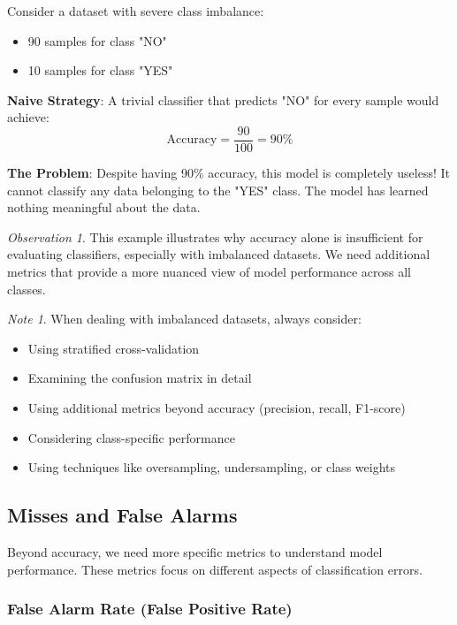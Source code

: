 \documentclass[11pt,a4paper]{article}
\theoremstyle{definition}
\theoremstyle{plain}
\theoremstyle{remark}
\newtheorem*{remark}{Note}
\newtheorem*{observation}{Observation}
\begin{document}
Consider a dataset with severe class imbalance:
\begin{itemize}
    \item 90 samples for class "NO"
    \item 10 samples for class "YES"
\end{itemize}

\textbf{Naive Strategy}: A trivial classifier that predicts "NO" for every sample would achieve:
\[
\text{Accuracy} = \frac{90}{100} = 90\%
\]

\textbf{The Problem}: Despite having 90\% accuracy, this model is completely useless! It cannot classify any data belonging to the "YES" class. The model has learned nothing meaningful about the data.

\begin{observation}
This example illustrates why accuracy alone is insufficient for evaluating classifiers, especially with imbalanced datasets. We need additional metrics that provide a more nuanced view of model performance across all classes.
\end{observation}

\begin{remark}
When dealing with imbalanced datasets, always consider:
\begin{itemize}
    \item Using stratified cross-validation
    \item Examining the confusion matrix in detail
    \item Using additional metrics beyond accuracy (precision, recall, F1-score)
    \item Considering class-specific performance
    \item Using techniques like oversampling, undersampling, or class weights
\end{itemize}
\end{remark}

\subsection{Misses and False Alarms}

Beyond accuracy, we need more specific metrics to understand model performance. These metrics focus on different aspects of classification errors.

\subsubsection{False Alarm Rate (False Positive Rate)}
\end{document}
